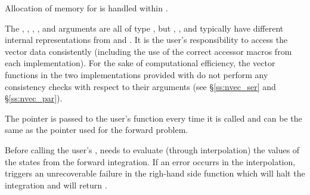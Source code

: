 {
  Allocation of memory for  is handled within {\idas}.

  The , , , , and  arguments are all 
  of type , but , , and  typically have 
  different internal representations from  and . It is the user's 
  responsibility to access the vector data consistently (including the use of the 
  correct accessor macros from each {\nvector} implementation). For the sake of 
  computational efficiency, the vector functions in the two {\nvector} implementations 
  provided with {\idas} do not perform any consistency checks with respect to their 
   arguments (see \S\ref{ss:nvec_ser} and \S\ref{ss:nvec_par}).

  The  pointer is passed to 
  the user's  function every time it is called and can be the same as the 
   pointer used for the forward problem.

  {\warn}Before calling the user's , {\idaa} needs to evaluate
  (through interpolation) the values of the states from the forward integration. 
  If an error occurrs in the interpolation, {\idaa} triggers an unrecoverable
  failure in the righ-hand side function which will halt the integration and
   will return .
}


